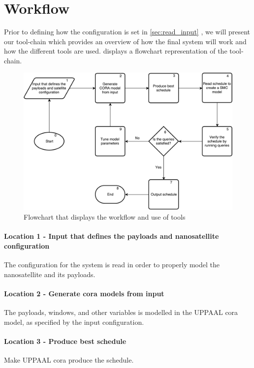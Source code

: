 \section{Workflow} \label{subsec:tool_chainv}
Prior to defining how the configuration is set in \cref{sec:read_input} , we will present our tool-chain which provides an overview of how the final system will work and how the different tools are used.
 displays a flowchart representation of the tool-chain.

\begin{figure}[h]
	\includegraphics[width=\textwidth]{graphics/flow_final.pdf}
	\caption{Flowchart that displays the workflow and use of tools}
	\label{fig:tool1}
\end{figure}

\paragraph{Location 1 - Input that defines the payloads and nanosatellite configuration} 
The configuration for the system is read in order to properly model the nanosatellite and its payloads.

\paragraph{Location 2 - Generate \gls{cora} models from input} 
The payloads, windows, and other variables is modelled in the UPPAAL \gls{cora} model, as specified by the input configuration.

\paragraph{Location 3 - Produce best schedule} 
Make UPPAAL \gls{cora}  produce the schedule.

